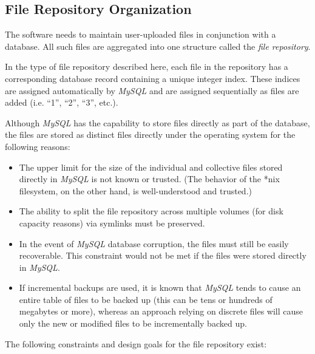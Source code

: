 \subsection{File Repository Organization}
\label{ctbg0:sddd0:sfro0}

The \emph{\productbasename{}} software needs to maintain user-uploaded
files in conjunction with a 
database.  All such files are aggregated into one structure
called the \emph{file repository}.

In the type of file repository described here, each file in the repository
has a corresponding database record containing a unique integer index.  These indices
are assigned automatically by \emph{MySQL} and are assigned sequentially
as files are added (i.e. ``1'', ``2'', ``3'', etc.).

Although
\emph{MySQL} has the capability to store files directly as part of
the database, the files are stored as distinct files directly
under the operating system for the following
reasons:

\begin{itemize}
\item The upper limit for the size of the individual and collective
      files stored directly in 
      \emph{MySQL} is not known or trusted.  (The behavior of 
      the *nix filesystem, on the other hand, is well-understood
      and trusted.)
\item The ability to split the file repository across multiple
      volumes (for disk capacity reasons) via symlinks must
      be preserved.
\item In the event of \emph{MySQL} database corruption, the files must still
      be easily recoverable.  This constraint would not be met if the
      files were stored directly in \emph{MySQL}.
\item If incremental backups are used, it is known that \emph{MySQL} tends
      to cause an entire table of files to be backed up (this can be tens
      or hundreds of megabytes or more), whereas an approach relying on discrete
      files will cause only the new or modified files to be incrementally
      backed up.
\end{itemize}

The following constraints and design goals for the file repository exist:

